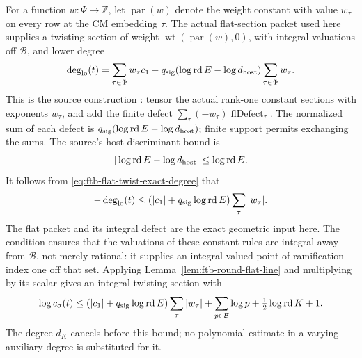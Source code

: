 For a function \(w:\Psi\to\mathbb Z\), let
\(\operatorname{par}(w)\) denote the weight constant with value
\(w_\tau\) on every row at the CM embedding \(\tau\).
The actual flat-section packet used here supplies a twisting
section of weight
\(\operatorname{wt}(\operatorname{par}(w),0)\), with integral
valuations off \(\mathcal B\), and lower degree
\begin{equation}\label{eq:ftb-flat-twist-exact-degree}
 \deg_{\rm lo}(t)=
 \sum_{\tau\in\Psi}w_\tau c_1
 -q_{\rm sig}(\log\operatorname{rd}E-\log d_{\rm host})
                                      \sum_{\tau\in\Psi}w_\tau .
\end{equation}
This is the source construction
: tensor the actual
rank-one constant sections with exponents \(w_\tau\), and add
the finite defect
\(\sum_\tau(-w_\tau)\operatorname{flDefect}_\tau\).
The normalized sum of each defect is
\(q_{\rm sig}(\log\operatorname{rd}E-\log d_{\rm host})\);
finite support permits exchanging the sums.
The source's host discriminant bound is
\[
 |\log\operatorname{rd}E-\log d_{\rm host}|
                                      \le\log\operatorname{rd}E .
\]
It follows from \eqref{eq:ftb-flat-twist-exact-degree} that
\[
 -\deg_{\rm lo}(t)\le
 (|c_1|+q_{\rm sig}\log\operatorname{rd}E)\sum_\tau|w_\tau|.
\]
The flat packet and its integral defect are the exact geometric
input here.
The condition  ensures that the valuations of
these constant rules are integral away from \(\mathcal B\), not
merely rational: it supplies an integral valued point of
ramification index one off that set.
Applying Lemma~\ref{lem:ftb-round-flat-line} and multiplying by its
scalar gives an integral twisting section with
\begin{equation}\label{eq:ftb-flat-twist-short}
 \log c_\sigma(t)\le
 (|c_1|+q_{\rm sig}\log\operatorname{rd}E)\sum_\tau|w_\tau|
 +\sum_{p\in\mathcal B}\log p+\tfrac12\log\operatorname{rd}K+1 .
\end{equation}
The degree \(d_K\) cancels before this bound; no polynomial
estimate in a varying auxiliary degree is substituted for it.

